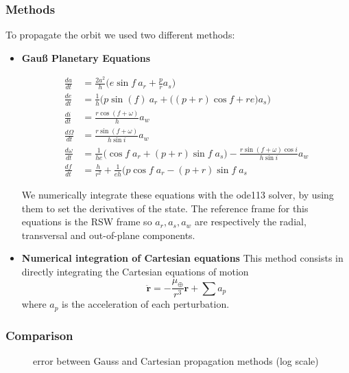 \documentclass[11pt,a4paper]{report}
\renewcommand{\vec}[1]{\mathbf{#1}}
\begin{document}
\subsubsection{Methods}
To propagate the orbit we used two different methods:
\begin{itemize}
    \item \textbf{Gauß Planetary Equations}
    \par
    \begin{align*}
        \frac{da}{dt}&=\frac{2a^2}{h}\Big(e\sin f \: a_r +\frac{p}{r}a_s\Big)\\
        \frac{de}{dt}&=\frac{1}{h}\Big(p\sin(f) \: a_r+ \Big( (p+r)\cos f +re \Big) a_s\Big)\\
        \frac{di}{dt} &= \frac{r\cos(f+\omega)}{h}a_w\\
        \frac{d\Omega}{dt}&=\frac{r\sin (f+\omega) }{h \sin i}a_w\\
        \frac{d\omega}{dt}&=\frac{1}{he} \Big( \cos f \; a_r + (p+r)\sin f \; a_s \Big ) - \frac{r\sin(f+\omega)\cos i}{h\sin i} a_w\\
        \frac{df}{dt} &= \frac{h}{r^2} + \frac{1}{eh} \Big(p \cos f \; a_r - (p+r)\sin f \; a_s 
    \end{align*}

    \par
    We numerically integrate these equations with the ode113 solver, by using them to set the derivatives of the state.
    The reference frame for this equations is the RSW frame so $a_r, a_s, a_w$ are respectively the  radial, transversal and out-of-plane components.  \cite{RSW_Curtis} \cite{RSW_Vallado} \cite{RSW_Battin}
    
    \item \textbf{Numerical integration of Cartesian equations}
    This method consists in directly integrating the Cartesian equations of motion
    \begin{equation}
        \vec{\ddot{r}} = - \frac{\mu_{\oplus}}{r^3}\vec{r} + \sum{a_{p}}
    \end{equation}
    where $a_{p}$ is the acceleration of each perturbation.
    
\end{itemize}

\subsubsection{Comparison}
\par
\begin{figure}[H]
\centering
{}
    \caption{error between Gauss and Cartesian propagation methods (log scale)}
\end{figure}
\end{document}
